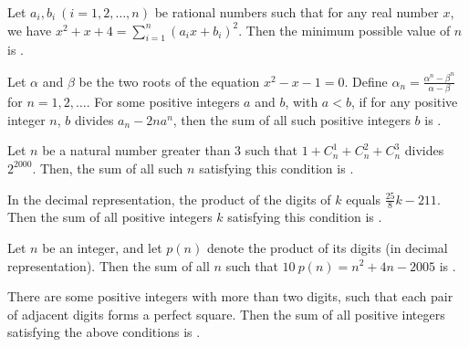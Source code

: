 \begin{problem}\label{Alg36}
 Let $a_i, b_i \ (i=1,2,\ldots,n)$ be rational numbers such that for any real number $x$, we have $x^2 + x + 4 = \sum_{i=1}^{n} (a_{i}x + b_{i})^{2}$. Then the minimum possible value of $n$ is \underline{\hspace{2cm}}.	
\end{problem}

\begin{problem}\label{Alg37}
Let $\alpha$ and $\beta$ be the two roots of the equation $x^2 - x - 1 = 0$. Define $\alpha_n = \frac{\alpha^n - \beta^n}{\alpha - \beta}$ for $n = 1, 2, \ldots$. For some positive integers $a$ and $b$, with $a < b$, if for any positive integer $n$, $b$ divides $a_n - 2na^n$, then the sum of all such positive integers $b$ is \underline{\hspace{2cm}}.	
\end{problem}


\begin{problem}\label{Alg38}
Let $n$ be a natural number greater than $3$ such that $1+C_n^1+C_n^2+C_n^3$ divides $2^{2000}$. Then, the sum of all such $n$ satisfying this condition is \underline{\hspace{2cm}}.	
\end{problem}



\begin{problem}\label{Alg39}
In the decimal representation, the product of the digits of $k$ equals $\frac{25}{8}k-211$. Then the sum of all positive integers $k$ satisfying this condition is \underline{\hspace{2cm}}.	
\end{problem}


\begin{problem}\label{Alg40}
Let $n$ be an integer, and let $p(n)$ denote the product of its digits (in decimal representation). Then the sum of all $n$ such that $10\:p(n)=n^{2}+4n-2005$ is \underline{\hspace{2cm}}.
	
\end{problem}



\begin{problem}\label{Alg41}
There are some positive integers with more than two digits, such that each pair of adjacent digits forms a perfect square. Then the sum of all positive integers satisfying the above conditions is \underline{\hspace{2cm}}.	
\end{problem}



